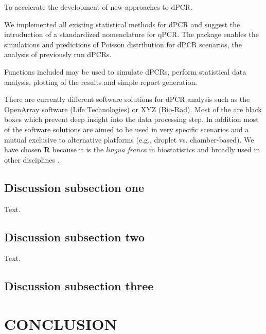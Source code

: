 \documentclass[a4,center,fleqn]{NAR}
\begin{document}
To accelerate the development of new approaches to dPCR. 

We implemented all existing statistical methods for dPCR and suggest the 
introduction of a standardized nomenclature for qPCR. The package enables the 
simulations and predictions of Poisson distribution for dPCR scenarios, the 
analysis of previously run dPCRs.

Functions included may be used to simulate dPCRs, perform statistical data 
analysis, plotting of the results and simple report generation. 

There are currently different software solutions for dPCR analysis such as the 
OpenArray software (Life Technologies) or XYZ (Bio-Rad). Most of the are black 
boxes which prevent deep insight into the data processing step. In addition most 
of the software solutions are aimed to be used in very specific scenarios and a 
mutual exclusive to alternative platforms (e.g., droplet vs. chamber-based). We 
have chosen \textbf{R} because it is the \textit{lingua franca} in biostatistics and broadly used 
in other disciplines \cite{rodiger_r_2015}.

\subsection{Discussion subsection one}

Text.


\subsection{Discussion subsection two}

Text.


\subsection{Discussion subsection three}


\section{CONCLUSION}
\end{document}
